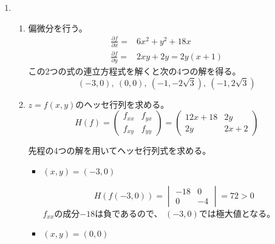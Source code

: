 \documentclass[12pt,b5paper]{ltjsarticle}
\begin{document}
\begin{enumerate}
 \item

%
%
%
%
%

      \begin{enumerate}
       \item
            偏微分を行う。
            \begin{align}
             \frac{\partial f}{\partial x}
             =& 6x^2 + y^2 + 18x\\
             \frac{\partial f}{\partial y}
             =& 2xy + 2y = 2y(x+1)
            \end{align}
            この2つの式の連立方程式を解くと次の4つの解を得る。
            \begin{equation}
             (-3,0), \ (0,0), \ (-1,-2\sqrt{3}), \ (-1,2\sqrt{3})
            \end{equation}
       \item
            $z=f(x,y)$のヘッセ行列を求める。
            \begin{equation}
             H(f) =
              \begin{pmatrix}
               f_{xx} & f_{yx}\\
               f_{xy} & f_{yy}
              \end{pmatrix}
              =
              \begin{pmatrix}
               12x+18 & 2y\\
               2y & 2x+2
              \end{pmatrix}
            \end{equation}

            先程の4つの解を用いてヘッセ行列式を求める。
            \begin{itemize}
             \item $(x,y)=(-3,0)$

                   \begin{equation}
                    H(f(-3,0))
                     = \begin{vmatrix}-18&0\\0&-4\end{vmatrix}
                     = 72 >0
                   \end{equation}
                   $f_{xx}$の成分$-18$は負であるので、
                   $(-3,0)$では極大値となる。
             \item $(x,y)=(0,0)$


\end{itemize}
\end{enumerate}
\end{enumerate}
\end{document}
